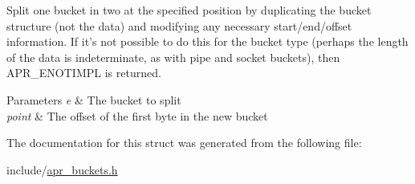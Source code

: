 Split one bucket in two at the specified position by duplicating the bucket structure (not the data) and modifying any necessary start/end/offset information. If it's not possible to do this for the bucket type (perhaps the length of the data is indeterminate, as with pipe and socket buckets), then A\-P\-R\-\_\-\-E\-N\-O\-T\-I\-M\-P\-L is returned. 
\begin{DoxyParams}{Parameters}
{\em e} & The bucket to split \\
\hline
{\em point} & The offset of the first byte in the new bucket \\
\hline
\end{DoxyParams}


The documentation for this struct was generated from the following file\-:\begin{DoxyCompactItemize}
\item 
include/\hyperlink{apr__buckets_8h}{apr\-\_\-buckets.\-h}\end{DoxyCompactItemize}
